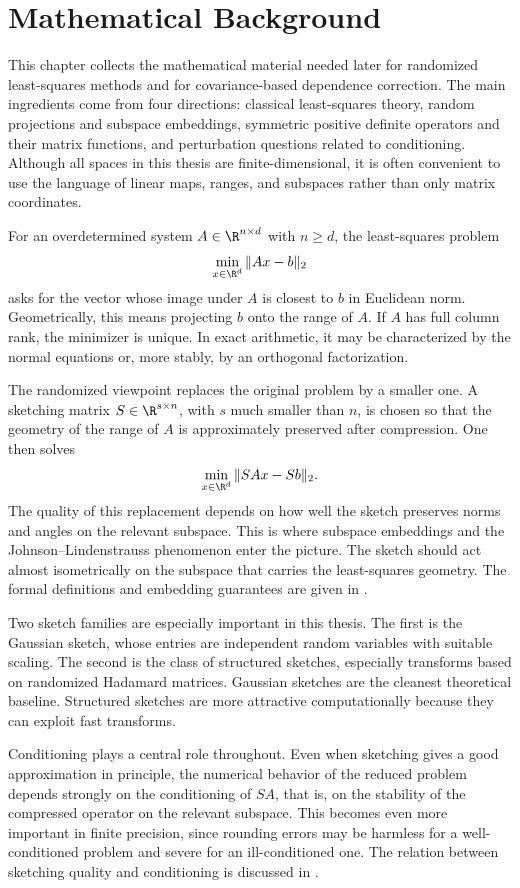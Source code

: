 \chapter{Mathematical Background} \label{ch:background}

This chapter collects the mathematical material needed later for randomized
least-squares methods and for covariance-based dependence correction. The main
ingredients come from four directions: classical least-squares theory, random
projections and subspace embeddings, symmetric positive definite operators and
their matrix functions, and perturbation questions related to conditioning.
Although all spaces in this thesis are finite-dimensional, it is often convenient to
use the language of linear maps, ranges, and subspaces rather than only matrix
coordinates.

For an overdetermined system \(A \in \R^{n \times d}\) with \(n \ge d\), the least-squares problem
\[
	\min_{x \in \R^d} \|Ax-b\|_2
\]
asks for the vector whose image under \(A\) is closest to \(b\) in Euclidean norm.
Geometrically, this means projecting \(b\) onto the range of \(A\). If \(A\) has
full column rank, the minimizer is unique. In exact arithmetic, it may be
characterized by the normal equations or, more stably, by an orthogonal
factorization.

The randomized viewpoint replaces the original problem by a smaller one. A
sketching matrix \(S \in \R^{s \times n}\), with \(s\) much smaller than \(n\), is
chosen so that the geometry of the range of \(A\) is approximately preserved after
compression. One then solves
\[
	\min_{x \in \R^d} \|SAx-Sb\|_2.
\]
The quality of this replacement depends on how well the sketch preserves norms
and angles on the relevant subspace. This is where subspace embeddings and the
Johnson--Lindenstrauss phenomenon enter the picture. The sketch should act
almost isometrically on the subspace that carries the least-squares geometry. The
formal definitions and embedding guarantees are given in .

Two sketch families are especially important in this thesis. The first is the
Gaussian sketch, whose entries are independent random variables with suitable
scaling. The second is the class of structured sketches, especially transforms based
on randomized Hadamard matrices. Gaussian sketches are the cleanest theoretical
baseline. Structured sketches are more attractive computationally because they can
exploit fast transforms.

Conditioning plays a central role throughout. Even when sketching gives a good
approximation in principle, the numerical behavior of the reduced problem depends
strongly on the conditioning of \(SA\), that is, on the stability of the compressed
operator on the relevant subspace. This becomes even more important in finite
precision, since rounding errors may be harmless for a well-conditioned problem
and severe for an ill-conditioned one. The relation between sketching quality and
conditioning is discussed in .

